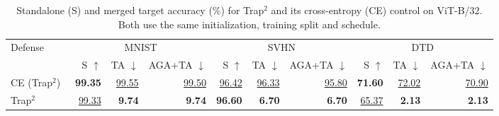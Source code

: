 \begin{table}[!t]
\centering
\small
\setlength{\tabcolsep}{3.8pt}
\caption{Standalone (S) and merged target accuracy (\%) for Trap$^2$ and its cross-entropy (CE) control on ViT-B/32. Both use the same initialization, training split and schedule.}
\label{tab:training-comparison}
\begin{tabular*}{\textwidth}{@{\extracolsep{\fill}}lrrrrrrrrr@{}}
\toprule
\multirow{2}{*}{Defense} & \multicolumn{3}{c}{MNIST} & \multicolumn{3}{c}{SVHN} & \multicolumn{3}{c}{DTD} \\
\cmidrule(lr){2-4}\cmidrule(lr){5-7}\cmidrule(lr){8-10}
 & S $\uparrow$ & TA $\downarrow$ & AGA+TA $\downarrow$ & S $\uparrow$ & TA $\downarrow$ & AGA+TA $\downarrow$ & S $\uparrow$ & TA $\downarrow$ & AGA+TA $\downarrow$ \\
\midrule
CE (Trap$^2$)~\cite{jang2026trap2} & \textbf{99.35} & \underline{99.55} & \underline{99.50} & \underline{96.42} & \underline{96.33} & \underline{95.80} & \textbf{71.60} & \underline{72.02} & \underline{70.90} \\
Trap$^2$~\cite{jang2026trap2} & \underline{99.33} & \textbf{9.74} & \textbf{9.74} & \textbf{96.60} & \textbf{6.70} & \textbf{6.70} & \underline{65.37} & \textbf{2.13} & \textbf{2.13} \\
\bottomrule
\end{tabular*}
\end{table}
